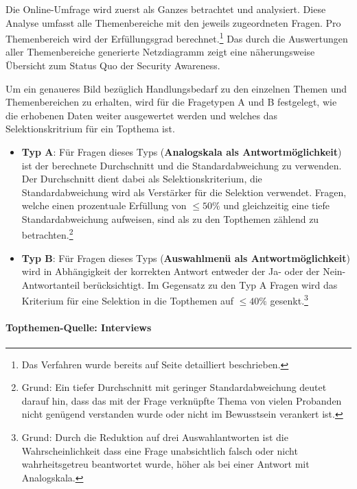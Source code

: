 \documentclass[../../main.tex]{subfiles}
\begin{document}
\begin{sloppypar}
Die Online-Umfrage wird zuerst als Ganzes betrachtet und analysiert. Diese Analyse umfasst alle Themenbereiche mit den jeweils zugeordneten Fragen. Pro Themenbereich wird der Erfüllungsgrad berechnet.\footnote{Das Verfahren wurde bereits auf Seite \pageref{Beispielberechnung Themenabdeckung} detailliert beschrieben.} Das durch die Auswertungen aller Themenbereiche generierte Netzdiagramm zeigt eine näherungsweise Übersicht zum Status Quo der Security Awareness.

Um ein genaueres Bild bezüglich Handlungsbedarf zu den einzelnen Themen und Themenbereichen zu erhalten, wird für die Fragetypen A und B festgelegt, wie die erhobenen Daten weiter ausgewertet werden und welches das Selektionskritrium für ein Topthema ist.

\begin{itemize}

\item{\textbf{Typ A}: Für Fragen dieses Typs (\textbf{Analogskala als Antwortmöglichkeit}) ist der berechnete Durchschnitt und die Standardabweichung zu verwenden. Der Durchschnitt dient dabei als Selektionskriterium, die Standardabweichung wird als Verstärker für die Selektion verwendet. Fragen, welche einen prozentuale Erfüllung von $\le  50\%$ und gleichzeitig eine tiefe Standardabweichung aufweisen, sind als zu den Topthemen zählend zu betrachten.\footnote{Grund: Ein tiefer Durchschnitt mit geringer Standardabweichung deutet darauf hin, dass das mit der Frage verknüpfte Thema von vielen Probanden nicht genügend verstanden wurde oder nicht im Bewusstsein verankert ist.} }

\item{\textbf{Typ B}: Für Fragen dieses Typs (\textbf{Auswahlmenü als Antwortmöglichkeit}) wird in Abhängigkeit der korrekten Antwort entweder der Ja- oder der Nein-Antwortanteil berücksichtigt. Im Gegensatz zu den Typ A Fragen wird das Kriterium für eine Selektion in die Topthemen auf $\le 40\%$ gesenkt.\footnote{Grund: Durch die Reduktion auf drei Auswahlantworten ist die Wahrscheinlichkeit dass eine Frage unabsichtlich falsch oder nicht wahrheitsgetreu beantwortet wurde, höher als bei einer Antwort mit Analogskala.} }

\end{itemize}

\end{sloppypar}

\paragraph*{Topthemen-Quelle: Interviews}\mbox{}
\end{document}
